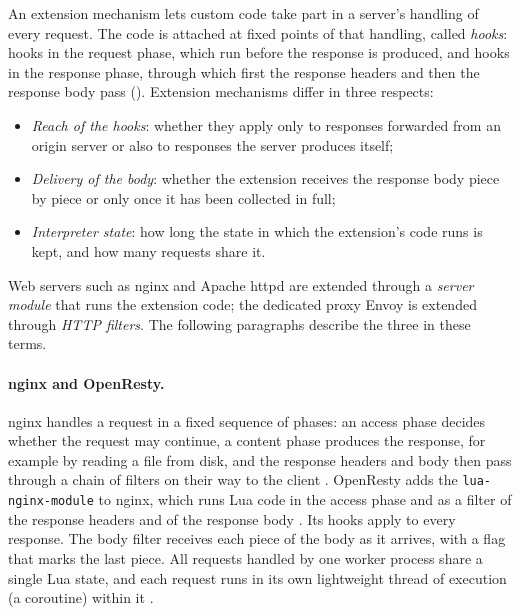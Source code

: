 \documentclass{rptuma}
\begin{document}
An extension mechanism lets custom code take part in a server's handling of every request. The code
is attached at fixed points of that handling, called \emph{hooks}: hooks in the request phase, which
run before the response is produced, and hooks in the response phase, through which first the
response headers and then the response body pass (). Extension mechanisms
differ in three respects:
\begin{itemize}
  \item \emph{Reach of the hooks}: whether they apply only to responses forwarded from an origin
    server or also to responses the server produces itself;
  \item \emph{Delivery of the body}: whether the extension receives the response body piece by
    piece or only once it has been collected in full;
  \item \emph{Interpreter state}: how long the state in which the extension's code runs is kept, and
    how many requests share it.
\end{itemize}
Web servers such as nginx and Apache httpd are extended through a \emph{server module} that runs the
extension code; the dedicated proxy Envoy is extended through \emph{HTTP filters}. The following
paragraphs describe the three in these terms.

\paragraph{nginx and OpenResty.} nginx handles a request in a fixed sequence of phases: an access
phase decides whether the request may continue, a content phase produces the response, for example
by reading a file from disk, and the response headers and body then pass through a chain of filters
on their way to the client \cite{nginx_devguide}. OpenResty adds the \texttt{lua-nginx-module} to
nginx, which runs Lua code in the access phase and as a filter of the response headers and of the
response body \cite{luanginx}. Its hooks apply to every response. The body filter receives each piece of the body as it arrives, with a
flag that marks the last piece. All requests handled by one worker process share a single Lua state,
and each request runs in its own lightweight thread of execution (a coroutine) within it
\cite{luanginx}.
\end{document}
